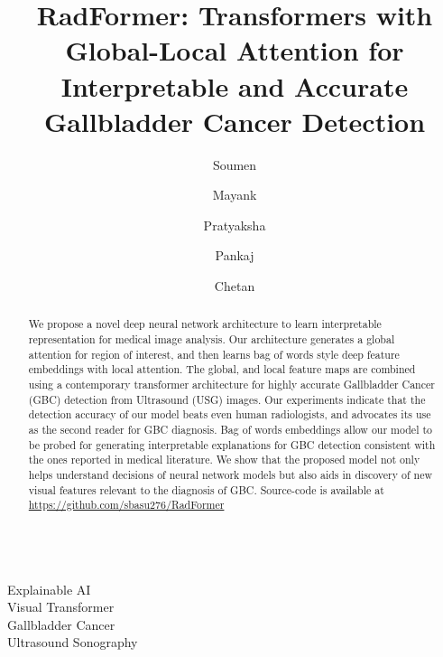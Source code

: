 \documentclass[twocolumn,final]{elsarticle}
\def\myarch{RadFormer\xspace}
\begin{document}

\begin{frontmatter}

\title{\myarch: Transformers with Global-Local Attention for Interpretable and Accurate Gallbladder Cancer Detection}


\author[1]{Soumen }
\author[1]{Mayank }
\author[2]{Pratyaksha }
\author[2]{Pankaj }
\author[1]{Chetan }


\address[1]{Department of Computer Science, Indian Institute of Technology Delhi, New Delhi, India}
\address[2]{Department of Radiodiagnosis and Imaging, Postgraduate Institute of Medical Education \& Research, Chandigarh, India}

\availableonline{}
\communicated{}

\begin{abstract}
	We propose a novel deep neural network architecture to learn interpretable representation for medical image analysis. Our architecture generates a global attention for region of interest, and then learns bag of words style deep feature embeddings with local attention. The global, and local feature maps are combined using a contemporary transformer architecture for highly accurate Gallbladder Cancer (GBC) detection from Ultrasound (USG) images. Our experiments indicate that the detection accuracy of our model beats even human radiologists, and advocates its use as the second reader for GBC diagnosis. Bag of words embeddings allow our model to be probed for generating interpretable explanations for GBC detection consistent with the ones reported in medical literature. We show that the proposed model not only helps understand decisions of neural network models but also aids in discovery of new visual features relevant to the diagnosis of GBC. Source-code is available at \url{https://github.com/sbasu276/RadFormer}
\end{abstract}

\begin{keyword}
\KWD \\
Explainable AI \\
Visual Transformer \\
Gallbladder Cancer \\
Ultrasound Sonography
\end{keyword}

\end{frontmatter}
\end{document}
